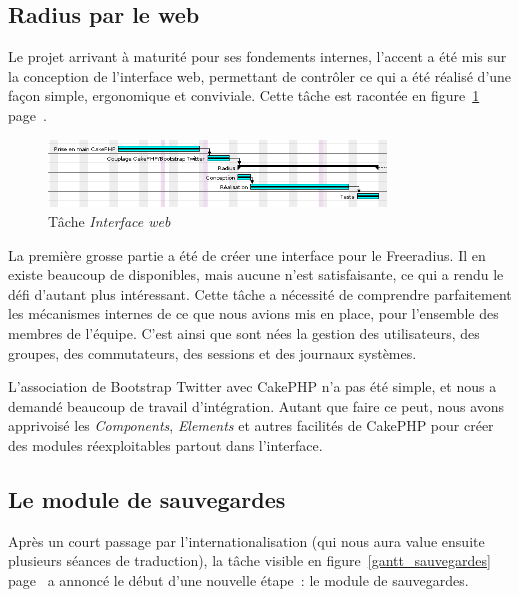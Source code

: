 \subsection{Radius par le web}

Le projet arrivant à maturité pour ses fondements internes, l'accent a été mis sur la conception de l'interface web, permettant de contrôler ce qui a été réalisé d'une façon simple, ergonomique et conviviale. Cette tâche est racontée en figure~\ref{gantt_cake} page~\pageref{gantt_cake}.

\begin{figure}[!h]
	\begin{center}
		\includegraphics[width=0.8\textwidth]{img/gantt_cake.png}
	\end{center}
	\caption{Tâche \textit{Interface web}}
	\label{gantt_cake}
\end{figure}

La première grosse partie a été de créer une interface pour le Freeradius. Il en existe beaucoup de disponibles, mais aucune n'est satisfaisante, ce qui a rendu le défi d'autant plus intéressant. Cette tâche a nécessité de comprendre parfaitement les mécanismes internes de ce que nous avions mis en place, pour l'ensemble des membres de l'équipe. C'est ainsi que sont nées la gestion des utilisateurs, des groupes, des commutateurs, des sessions et des journaux systèmes.

L'association de Bootstrap Twitter avec CakePHP n'a pas été simple, et nous a demandé beaucoup de travail d'intégration. Autant que faire ce peut, nous avons apprivoisé les \emph{Components}, \emph{Elements} et autres facilités de CakePHP pour créer des modules réexploitables partout dans l'interface.

\subsection{Le module de sauvegardes}

Après un court passage par l'internationalisation (qui nous aura value ensuite plusieurs séances de traduction), la tâche visible en figure~\ref{gantt_sauvegardes} page~\pageref{gantt_sauvegardes} a annoncé le début d'une nouvelle étape~: le module de sauvegardes.

